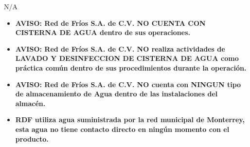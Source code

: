 N/A

\begin{itemize}
	\item \textbf{AVISO: Red de Fríos S.A. de C.V. NO CUENTA CON CISTERNA DE AGUA dentro de sus operaciones.}
	\item \textbf{AVISO: Red de Fríos S.A. de C.V. NO realiza actividades de LAVADO Y DESINFECCION DE CISTERNA DE AGUA como práctica común dentro de sus procedimientos durante la operación.}
	\item \textbf{AVISO: Red de Fríos S.A. de C.V. NO cuenta con NINGUN tipo de almacenamiento de Agua dentro de las instalaciones del almacén.}
	\item \textbf{\gls{RDF} utiliza agua suministrada por la red municipal de Monterrey, esta agua no tiene contacto directo en ningún momento con el producto.}
\end{itemize}
